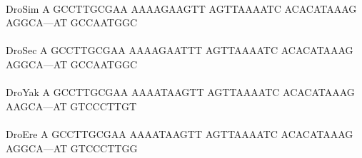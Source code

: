 \documentclass[11pt,twoside,reqno,a4paper]{article}
\begin{document}
{\hspace*{7\charwidth}\hspace*{1\charwidth}\hspace*{1\charwidth}\hspace*{1\charwidth}\hspace*{1\charwidth}\hspace*{1\charwidth}\hspace*{1\charwidth}\\
DroSim	A	GCCTTGCGAA	AAAAGAAGTT	AGTTAAAATC	ACACATAAAG	AGGCA---AT	GCCAATGGC\\
\hspace*{7\charwidth}\hspace*{1\charwidth}\hspace*{1\charwidth}\hspace*{1\charwidth}\hspace*{1\charwidth}\hspace*{1\charwidth}\hspace*{1\charwidth}\\
DroSec	A	GCCTTGCGAA	AAAAGAATTT	AGTTAAAATC	ACACATAAAG	AGGCA---AT	GCCAATGGC\\
\hspace*{7\charwidth}\hspace*{1\charwidth}\hspace*{1\charwidth}\hspace*{1\charwidth}\hspace*{1\charwidth}\hspace*{1\charwidth}\hspace*{1\charwidth}\\
DroYak	A	GCCTTGCGAA	AAAATAAGTT	AGTTAAAATC	ACACATAAAG	AAGCA---AT	GTCCCTTGT\\
\hspace*{7\charwidth}\hspace*{1\charwidth}\hspace*{1\charwidth}\hspace*{1\charwidth}\hspace*{1\charwidth}\hspace*{1\charwidth}\hspace*{1\charwidth}\\
DroEre	A	GCCTTGCGAA	AAAATAAGTT	AGTTAAAATC	ACACATAAAG	AGGCA---AT	GTCCCTTGG\\
\hspace*{7\charwidth}\hspace*{1\charwidth}\hspace*{1\charwidth}\hspace*{1\charwidth}\hspace*{1\charwidth}\hspace*{1\charwidth}\hspace*{1\charwidth}\\
}
\end{document}
